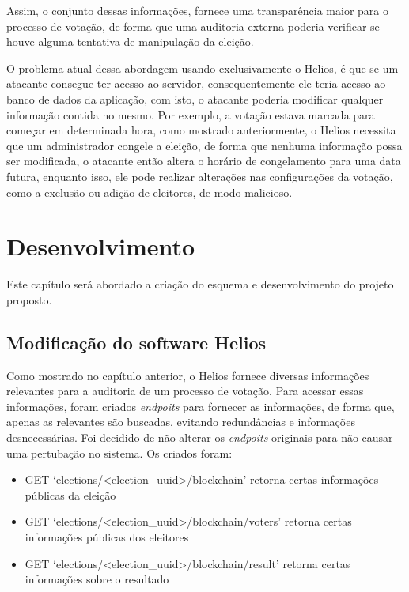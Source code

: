 \documentclass{ufsctex/ufsctex}
\begin{document}
\begin{lstlisting}[numbers=none]
\end{lstlisting}

Assim, o conjunto dessas informações, fornece uma transparência maior para o
processo de votação, de forma que uma auditoria externa poderia verificar se
houve alguma tentativa de manipulação da eleição. 

O problema atual dessa abordagem usando exclusivamente o Helios, é que se um
atacante consegue ter acesso ao servidor, consequentemente ele teria acesso ao
banco de dados da aplicação, com isto, o atacante poderia modificar qualquer
informação contida no mesmo. Por exemplo, a votação estava marcada para começar
em determinada hora, como mostrado anteriormente, o Helios necessita que um
administrador congele a eleição, de forma que nenhuma informação possa ser
modificada, o atacante então altera o horário de congelamento para uma data
futura, enquanto isso, ele pode realizar alterações nas configurações da
votação, como a exclusão ou adição de eleitores, de modo malicioso.


\chapter{Desenvolvimento}

Este capítulo será abordado a criação do esquema e desenvolvimento do projeto
proposto.

\section{Modificação do software Helios} 

Como mostrado no capítulo anterior, o Helios fornece diversas informações
relevantes para a auditoria de um processo de votação. Para acessar essas
informações, foram criados \textit{endpoits} para fornecer as informações, de
forma que, apenas as relevantes são buscadas, evitando redundâncias e
informações desnecessárias. Foi decidido de não alterar os \textit{endpoits}
originais para não causar uma pertubação no sistema. Os criados foram:


\begin{itemize}
	\item GET `elections/<election\_uuid>/blockchain' retorna certas
		informações públicas da eleição
	\item GET `elections/<election\_uuid>/blockchain/voters' retorna certas
		informações públicas dos eleitores
	\item GET `elections/<election\_uuid>/blockchain/result' retorna certas
		informações sobre o resultado
\end{itemize}
\end{document}
